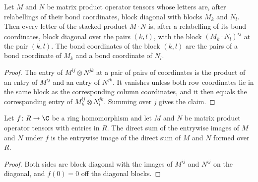 \begin{lemma}%
    \label{thm:asymex_mul_block_diagonal}
    \leanok
    Let $M$ and $N$ be matrix product operator tensors whose letters are,
    after relabellings of their bond coordinates, block diagonal with blocks
    $M_k$ and $N_l$. Then every letter of the stacked product
    $M\mathbin{\cdot}N$ is, after a relabelling of its bond coordinates,
    block diagonal over the pairs $(k,l)$, with the block
    $(M_k\mathbin{\cdot}N_l)^{ij}$ at the pair $(k,l)$. The bond coordinates
    of the block $(k,l)$ are the pairs of a bond coordinate of $M_k$ and a
    bond coordinate of $N_l$.
\end{lemma}

\begin{proof}
    \leanok
    The entry of $M^{ij}\otimes N^{jk}$ at a pair of pairs of coordinates is
    the product of an entry of $M^{ij}$ and an entry of $N^{jk}$. It vanishes
    unless both row coordinates lie in the same block as the corresponding
    column coordinates, and it then equals the corresponding entry of
    $M_k^{ij}\otimes N_l^{jk}$. Summing over $j$ gives the claim.
\end{proof}

\begin{lemma}%
    \label{lem:asymex_direct_sum_ring}
    \leanok
    Let $f\colon R\to\C$ be a ring homomorphism and let $M$ and $N$ be
    matrix product operator tensors with entries in $R$. The direct sum of
    the entrywise images of $M$ and $N$ under $f$ is the entrywise image of
    the direct sum of $M$ and $N$ formed over $R$.
\end{lemma}

\begin{proof}
    \leanok
    Both sides are block diagonal with the images of $M^{ij}$ and $N^{ij}$
    on the diagonal, and $f(0)=0$ off the diagonal blocks.
\end{proof}

